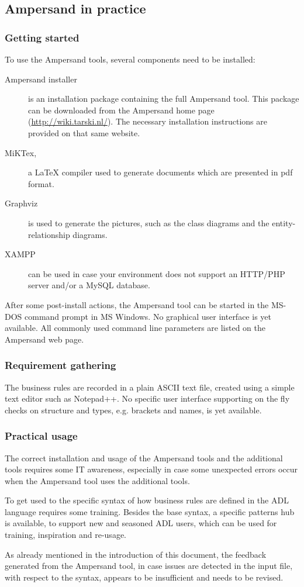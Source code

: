 
\subsection{Ampersand in practice}
\label{sec:InPractice}

\subsubsection{Getting started}
To use the Ampersand tools, several components need to be installed:
\begin{description}
	\item[Ampersand installer] is an installation package containing the full Ampersand tool. This package can be downloaded from the Ampersand home page (\url{http://wiki.tarski.nl/}). The necessary installation instructions are provided on that same website.
	\item[MiKTex,] a LaTeX compiler used to generate documents which are presented in pdf format.
	\item[Graphviz] is used to generate the pictures, such as the class diagrams and the entity-relationship diagrams. 
	\item[XAMPP] can be used in case your environment does not support an HTTP/PHP server and/or a MySQL database.
\end{description}

\noindent
After some post-install actions, the Ampersand tool can be started in the MS-DOS command prompt in MS Windows. 
No graphical user interface is yet available. All commonly used command line parameters are listed on the Ampersand web page.

\subsubsection{Requirement gathering}
The business rules are recorded in a plain ASCII text file, created using a simple text editor such as Notepad++.
No specific user interface supporting on the fly checks on structure and types, e.g. brackets and names, is yet available.

\subsubsection{Practical usage}
The correct installation and usage of the Ampersand tools and the additional tools requires some IT awareness, especially in case some unexpected errors occur when the Ampersand tool uses the additional tools. 

To get used to the specific syntax of how business rules are defined in the ADL language requires some training. 
Besides the base syntax, a specific patterns hub is available, to support new and seasoned ADL users, which can be used for training, inspiration and re-usage.

As already mentioned in the introduction of this document, the feedback generated from the Ampersand tool, in case  issues are detected in the input file, with respect to the syntax, appears to be insufficient and needs to be revised.